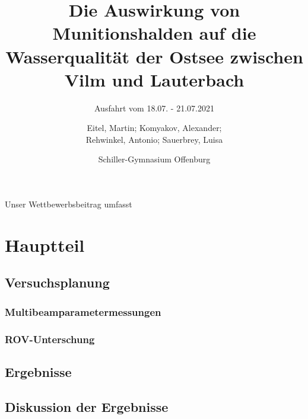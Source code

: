\documentclass[12pt,titlepage]{scrreprt}
\begin{document}
% 
\begin{titlepage}

	

\title{Die Auswirkung von Munitionshalden auf die Wasserqualität der Ostsee zwischen Vilm und Lauterbach}
\subtitle{Ausfahrt vom 18.07. - 21.07.2021}
\titlehead{\centering\texttt{[image: Bilder/DSC05220]}}


\author{Eitel, Martin; Komyakov, Alexander; \\ Rehwinkel, Antonio; Sauerbrey, Luisa\\ \and Schiller-Gymnasium Offenburg}

\publishers{Wissenschaftspate: Prof Dr. Jens Greinert \texttt{jgreinert@geomar.de} \\
\vspace*{2ex} Betreuer: Marek Czernohous \texttt{m.czernohous@schiller-offenburg.de}}

\maketitle

\end{titlepage}
Unser Wettbewerbsbeitrag umfasst

\tableofcontents

\chapter{Hauptteil}
\section{Versuchsplanung}
%
%
\subsection{Multibeamparametermessungen}

\subsection{ROV-Unterschung}
%
\section{Ergebnisse}
\section{Diskussion der Ergebnisse}






\end{document}
